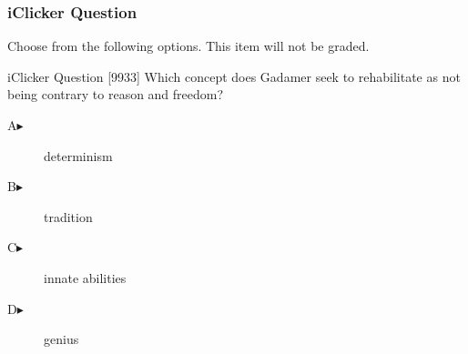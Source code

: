 \begin{frame}
  \frametitle{iClicker Question}
Choose from the following options. This item will not be graded.
\begin{block}{iClicker Question}
[9933] Which concept does Gadamer seek to rehabilitate as not being contrary
to reason and freedom?
\end{block}
\begin{description}
\item[A\hspace{.2in}$\blacktriangleright$] determinism
\item[B\hspace{.2in}$\blacktriangleright$] tradition
\item[C\hspace{.2in}$\blacktriangleright$] innate abilities
\item[D\hspace{.2in}$\blacktriangleright$] genius
\end{description}
\end{frame}
